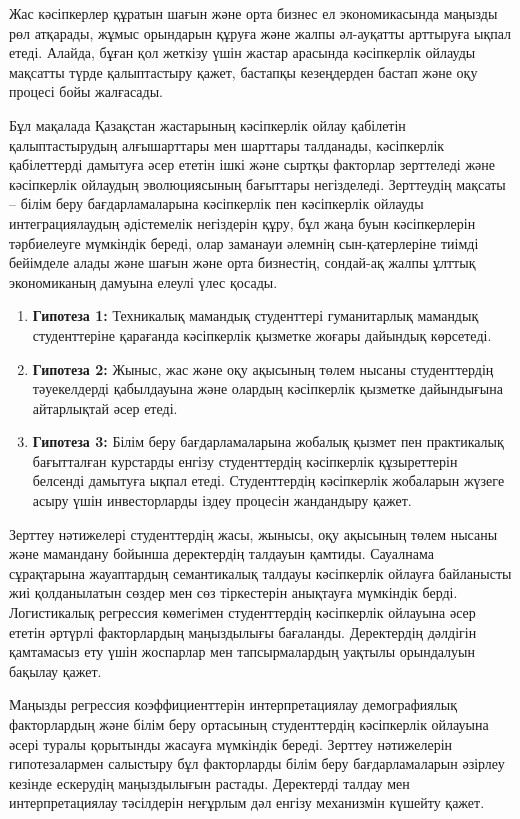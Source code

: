 \begin{multicols}{2}
Жас кәсіпкерлер құратын шағын және орта бизнес ел экономикасында маңызды
рөл атқарады, жұмыс орындарын құруға және жалпы әл-ауқатты арттыруға
ықпал етеді. Алайда, бұған қол жеткізу үшін жастар арасында кәсіпкерлік
ойлауды мақсатты түрде қалыптастыру қажет, бастапқы кезеңдерден бастап
және оқу процесі бойы жалғасады.

Бұл мақалада Қазақстан жастарының кәсіпкерлік ойлау қабілетін
қалыптастырудың алғышарттары мен шарттары талданады, кәсіпкерлік
қабілеттерді дамытуға әсер ететін ішкі және сыртқы факторлар зерттеледі
және кәсіпкерлік ойлаудың эволюциясының бағыттары негізделеді.
Зерттеудің мақсаты -- білім беру бағдарламаларына кәсіпкерлік пен
кәсіпкерлік ойлауды интеграциялаудың әдістемелік негіздерін құру, бұл
жаңа буын кәсіпкерлерін тәрбиелеуге мүмкіндік береді, олар заманауи
әлемнің сын-қатерлеріне тиімді бейімделе алады және шағын және орта
бизнестің, сондай-ақ жалпы ұлттық экономиканың дамуына елеулі үлес
қосады.

\begin{enumerate}
\def\labelenumi{\arabic{enumi}.}
\item
  {\bfseries Гипотеза 1:} Техникалық мамандық студенттері гуманитарлық
  мамандық студенттеріне қарағанда кәсіпкерлік қызметке жоғары дайындық
  көрсетеді.
\item
  {\bfseries Гипотеза 2:} Жыныс, жас және оқу ақысының төлем нысаны
  студенттердің тәуекелдерді қабылдауына және олардың кәсіпкерлік
  қызметке дайындығына айтарлықтай әсер етеді.
\item
  {\bfseries Гипотеза 3:} Білім беру бағдарламаларына жобалық қызмет пен
  практикалық бағытталған курстарды енгізу студенттердің кәсіпкерлік
  құзыреттерін белсенді дамытуға ықпал етеді. Студенттердің кәсіпкерлік
  жобаларын жүзеге асыру үшін инвесторларды іздеу процесін жандандыру
  қажет.
\end{enumerate}

Зерттеу нәтижелері студенттердің жасы, жынысы, оқу ақысының төлем нысаны
және мамандану бойынша деректердің талдауын қамтиды. Сауалнама
сұрақтарына жауаптардың семантикалық талдауы кәсіпкерлік ойлауға
байланысты жиі қолданылатын сөздер мен сөз тіркестерін анықтауға
мүмкіндік берді. Логистикалық регрессия көмегімен студенттердің
кәсіпкерлік ойлауына әсер ететін әртүрлі факторлардың маңыздылығы
бағаланды. Деректердің дәлдігін қамтамасыз ету үшін жоспарлар мен
тапсырмалардың уақтылы орындалуын бақылау қажет.

Маңызды регрессия коэффициенттерін интерпретациялау демографиялық
факторлардың және білім беру ортасының студенттердің кәсіпкерлік
ойлауына әсері туралы қорытынды жасауға мүмкіндік береді. Зерттеу
нәтижелерін гипотезалармен салыстыру бұл факторларды білім беру
бағдарламаларын әзірлеу кезінде ескерудің маңыздылығын растады.
Деректерді талдау мен интерпретациялау тәсілдерін неғұрлым дәл енгізу
механизмін күшейту қажет.


\end{multicols}
